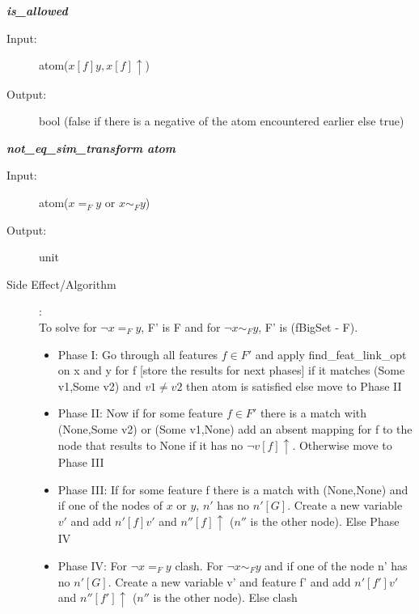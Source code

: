 \documentclass[12pt]{article}
\begin{document}
\begin{description}
\item \textbf{\textit{is\_allowed}}
\begin{description}
    \item[Input:] atom($x[f]y , x[f]\uparrow$)
    \item[Output:] bool (false if there is a negative of the atom encountered earlier else true)
\end{description}

\item \textbf{\textit{not\_eq\_sim\_transform atom}}
\begin{description}
    \item[Input:]  atom($x=_F y$ or $x\sim_F y$)
    \item[Output:] unit
    \item[Side Effect/Algorithm]:\\To solve for $\lnot x=_F y$, F' is F and for $\lnot x\sim_F y$, F' is (fBigSet - F). 
    

    \begin{itemize} %
        \item Phase I: Go through all features $f\in F'$ and apply find\_feat\_link\_opt on x and y for f [store the results for next phases] if it matches (Some v1,Some v2) and $v1\neq v2$ then atom is satisfied else move to Phase II
        \item Phase II: Now if for some feature $f\in F'$ there is a match with (None,Some v2) or (Some v1,None) add an absent mapping for f to the node that results to None if it has no $\lnot v[f]\uparrow$. Otherwise move to Phase III 
        \item Phase III: If for some feature f there is a match with (None,None) 
        and if one of the nodes of $x$ or $y$,
        $n'$ has no $n'[G]$. Create a new variable $v'$ and add $n'[f]v'$ and $n''[f] \uparrow$ ($n''$ is the other node). Else Phase IV
        \item Phase IV: For $\lnot x=_F y$ clash. For  $\lnot x\sim_F y$ and if one of the node n' has no $n'[G]$. Create a new variable v' and feature f' and add $n'[f']v'$ and $n''[f']\uparrow$ ($n''$ is the other node). Else clash

    \end{itemize}
\end{description}

\end{description}
\end{document}
